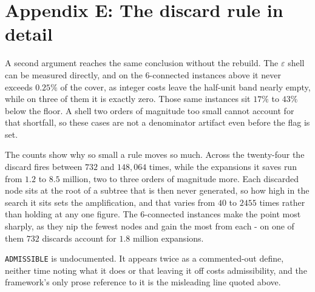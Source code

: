 \documentclass[letterpaper]{article} %
\begin{document}
\section{Appendix E: The discard rule in detail}\label{app:e}
A second argument reaches the same conclusion without the rebuild. The $\varepsilon$ shell can be measured directly, and on the 6-connected instances above it never exceeds $0.25\%$ of the cover, as integer costs leave the half-unit band nearly empty, while on three of them it is exactly zero. Those same instances sit $17\%$ to $43\%$ below the floor. A shell two orders of magnitude too small cannot account for that shortfall, so these cases are not a denominator artifact even before the flag is set.

The counts show why so small a rule moves so much. Across the twenty-four the discard fires between $732$ and $148{,}064$ times, while the expansions it saves run from $1.2$ to $8.5$ million, two to three orders of magnitude more. Each discarded node sits at the root of a subtree that is then never generated, so how high in the search it sits sets the amplification, and that varies from $40$ to $2455$ times rather than holding at any one figure. The 6-connected instances make the point most sharply, as they nip the fewest nodes and gain the most from each - on one of them $732$ discards account for $1.8$ million expansions.

\texttt{ADMISSIBLE} is undocumented. It appears twice as a commented-out define, neither time noting what it does or that leaving it off costs admissibility, and the framework's only prose reference to it is the misleading line quoted above.
\end{document}
